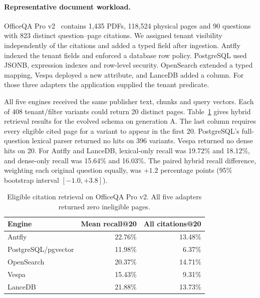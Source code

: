 \documentclass[sigconf,nonacm]{acmart}
\begin{document}
\paragraph{Representative document workload.}
OfficeQA Pro v2~\cite{officeqa-v2} contains 1,435 PDFs, 118,524 physical
pages and 90 questions with 823 distinct question--page citations.
We assigned tenant visibility independently of the citations and added a
typed field after ingestion. Antfly indexed the tenant fields and enforced
a database row policy. PostgreSQL used JSONB, expression indexes and
row-level security. OpenSearch extended a typed mapping, Vespa deployed a
new attribute, and LanceDB added a column. For those three adapters the
application supplied the tenant predicate.

All five engines received the same publisher text, chunks and query vectors.
Each of 408 tenant/filter variants could return 20 distinct pages.
Table~\ref{tab:officeqa-recall} gives hybrid retrieval results for the
evolved schema on generation A. The last column requires every eligible
cited page for a variant to appear in the first 20. PostgreSQL's full-question
lexical parser returned no hits on 396 variants. Vespa returned no dense hits
on 20. For Antfly and LanceDB, lexical-only recall was 19.72\% and 18.12\%,
and dense-only recall was 15.64\% and 16.03\%. The paired hybrid recall
difference, weighting each original question equally, was $+1.2$ percentage
points (95\% bootstrap interval $[-1.0,+3.8]$).

\begin{table}[t]
  \caption{Eligible citation retrieval on OfficeQA Pro v2. All five adapters returned zero ineligible pages.}
  \label{tab:officeqa-recall}
  \centering\small
  \begin{tabular}{@{}lrr@{}}
  \toprule
  Engine & Mean recall@20 & All citations@20 \\
  \midrule
  Antfly             & 22.76\% & 13.48\% \\
  PostgreSQL/pgvector & 11.98\% &  6.37\% \\
  OpenSearch         & 20.37\% & 14.71\% \\
  Vespa              & 15.43\% &  9.31\% \\
  LanceDB            & 21.88\% & 13.73\% \\
  \bottomrule
  \end{tabular}
\end{table}
\end{document}
